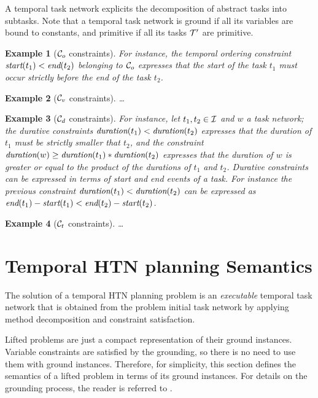 \documentclass[letterpaper]{article} %
\newtheorem{example}{Example}
\newcommand{\duration}{\text{\it duration}}
\newcommand{\tstart}{\text{\it start}}
\newcommand{\tend}{\text{\it end}}
\begin{document}
A temporal task network explicits the decomposition of abstract tasks into subtasks. %
Note that a temporal task network is ground if all its variables are bound to constants, and primitive if all its tasks ${\cal{T}}'$ are primitive.

\begin{example}[${\cal{C}}_o$ constraints]
 For instance, the temporal ordering constraint $\tstart(t_1) < \tend(t_2)$ belonging to ${\cal{C}}_o$ expresses that the start of the task $t_1$ must occur strictly  before the end of the task $t_2$.
  \end{example}

\begin{example}[${\cal{C}}_v$ constraints]
\ldots 
  \end{example}

\begin{example}[${\cal{C}}_d$ constraints]
  For instance, let $t_1, t_2 \in {\cal{I}}$ and $w$ a task network; the durative constraints $\duration(t_1) < \duration(t_2)$ expresses that the duration of $t_1$ must be strictly smaller that $t_2$, and the constraint $\duration(w) \geq \duration(t_1) * \duration(t_2)$ expresses that the duration of $w$ is greater or equal to the product of the durations of $t_1$ and $t_2$. Durative constraints can be expressed in terms of start and end events of a task. For instance the previous constraint $\duration(t_1) < \duration(t_2)$ can be expressed as  $\tend(t_1) - \tstart(t_1) < \tend(t_2) - \tstart(t_2)$.
  \end{example}

\begin{example}[${\cal{C}}_t$ constraints]
\ldots
  \end{example}


%
 \section{Temporal HTN planning Semantics}
 \label{THTN}

 The solution of a temporal HTN planning problem is an {\it executable} temporal task network that is obtained from the problem initial task network by applying method decomposition and constraint satisfaction.

  Lifted problems are just a compact representation of their ground instances. Variable constraints are satisfied by the grounding, so there is no need to use them with ground instances. Therefore, for simplicity, this section defines the semantics of a lifted problem in terms of its ground instances. For details on the grounding process, the reader is referred to \cite{behnke20,ramoul17}.
\end{document}
